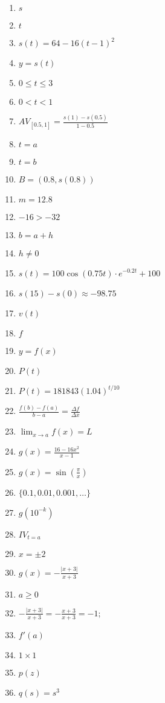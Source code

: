 \documentclass[oneside,10pt,]{article}
\title{}
\date{}
\newcommand{\lt}{<}
\begin{document}
\hypertarget{g:article:idp1}{}
%
\begin{enumerate}
\item{}\(s\)%
\item{}\(t\)%
\item{}\(s(t) = 64 - 16(t-1)^2\)%
\item{}\(y = s(t)\)%
\item{}\(0 \le t \le 3\)%
\item{}\(0 \lt t \lt 1\)%
\item{}\(AV_{[0.5,1]} = \frac{s(1) - s(0.5)}{1-0.5}\)%
\item{}\(t = a\)%
\item{}\(t = b\)%
\item{}\(B=(0.8, s(0.8))\)%
\item{}\(m = 12.8\)%
\item{}\(-16>-32\)%
\item{}\(b = a + h\)%
\item{}\(h \ne 0\)%
\item{}\(s(t) = 100\cos(0.75t) \cdot e^{-0.2t}+100\)%
\item{}\(s(15)-s(0) \approx -98.75\)%
\item{}\(v(t)\)%
\item{}\(f\)%
\item{}\(y = f(x)\)%
\item{}\(P(t)\)%
\item{}\(P(t) = 181843 (1.04)^{t/10}\)%
\item{}\(\frac{f(b)-f(a)}{b-a}=\frac{\Delta f}{\Delta x}\)%
\item{}\(\lim_{x \to a} f(x) = L\)%
\item{}\(g(x) = \frac{16 - 16x^2}{x-1}\)%
\item{}\(g(x) = \sin\left(\frac{\pi}{x}\right)\)%
\item{}\(\{0.1, 0.01, 0.001, \ldots\}\)%
\item{}\(g(10^{-k})\)%
\item{}\(IV_{t=a}\)%
\item{}\(x = \pm 2\)%
\item{}\(g(x) = -\frac{|x+3|}{x+3}\)%
\item{}\(a \ge 0\)%
\item{}\(-\frac{|x+3|}{x+3} = -\frac{x+3}{x+3} = -1;\)%
\item{}\(f'(a)\)%
\item{}\(1 \times 1\)%
\item{}\(p(z)\)%
\item{}\(\displaystyle q(s) = s^3\)%

\end{enumerate}
\end{document}
